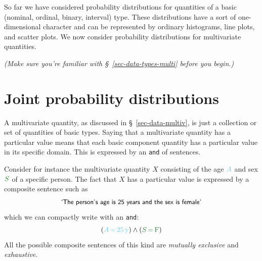 \documentclass[
  a4paper,
  DIV=11,
  numbers=noendperiod,
  oneside]{scrreprt}
\begin{document}
\providecommand{\ul}{\uline}
\renewcommand*{\|}[1][]{\nonscript\:#1\vert\nonscript\:\mathopen{}}
\providecommand*{\pr}[1]{\textsf{\small`#1'}}
\renewcommand*{\pr}[1]{\textsf{\small`#1'}}
\providecommand*{\prq}[1]{\textsf{\small #1}}

\providecommand{\se}[1]{\mathsfit{#1}}
\renewcommand{\se}[1]{\mathsfit{#1}}
\providecommand{\p}{\mathrm{p}}
\renewcommand{\p}{\mathrm{p}}
\renewcommand{\P}{\mathrm{P}}

\providecommand*{\mo}[1][=]{\mathord{\,#1\,}}
\providecommand*{\yX}{\se{X}}
\providecommand*{\yY}{\se{Y}}
\providecommand*{\yI}{\se{I}}
\providecommand*{\yi}[1][]{\se{I}_{\text{#1}}}
\providecommand{\di}{\mathrm{d}}

So far we have considered probability distributions for quantities of a
basic (nominal, ordinal, binary, interval) type. These distributions
have a sort of one-dimensional character and can be represented by
ordinary histograms, line plots, and scatter plots. We now consider
probability distributions for multivariate quantities.

{\emph{(Make sure you're familiar with §~\ref{sec-data-types-multi}
before you begin.)}}

\hypertarget{joint-probability-distributions}{%
\section{Joint probability
distributions}\label{joint-probability-distributions}}

A multivariate quantity, as discussed in §~\ref{sec-data-multiv}, is
just a collection or set of quantities of basic types. Saying that a
multivariate quantity has a particular value means that each basic
component quantity has a particular value in its specific domain. This
is expressed by an \texttt{and} of sentences.

Consider for instance the multivariate quantity \(X\) consisting of the
age \(\color[RGB]{102,204,238}A\) and sex \(\color[RGB]{34,136,51}S\) of
a specific person. The fact that \(X\) has a particular value is
expressed by a composite sentence such as \[
\textsf{\small`The person's age is 25 years and the sex is female'}
\] which we can compactly write with an \texttt{and}: \[
({\color[RGB]{102,204,238}A\mathord{\,=\,}25\,\mathrm{y}}) \land ({\color[RGB]{34,136,51}S\mathord{\,=\,}\mathrm{F}})
\] All the possible composite sentences of this kind are \emph{mutually
exclusive} and \emph{exhaustive}.
\end{document}

